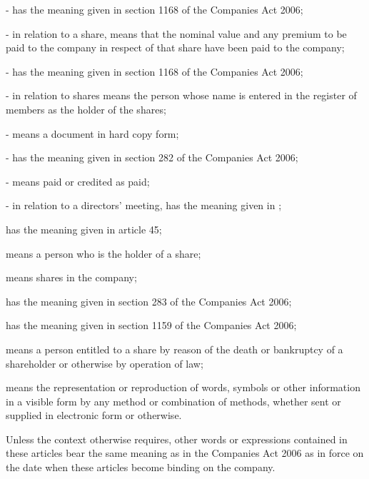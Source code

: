 \documentclass[letterpaper,10pt,openany,oneside,english]{sphinxmanual}
\begin{document}
 - has the meaning given in section 1168 of the Companies Act 2006;

 - in relation to a share, means that the nominal value and any premium to be paid to the company in respect of that share have been paid to the company;

 - has the meaning given in section 1168 of the Companies Act 2006;

 - in relation to shares means the person whose name is entered in the register of members as the holder of the shares;

 - means a document in hard copy form;

 - has the meaning given in section 282 of the Companies Act 2006;

 - means paid or credited as paid;

 - in relation to a directors’ meeting, has the meaning given in {\hyperref[\detokenize{directors:article-10}]{}};

 has the meaning given in article 45;

 means a person who is the holder of a share;

 means shares in the company;

 has the meaning given in section 283 of the Companies Act 2006;

 has the meaning given in section 1159 of the Companies Act 2006;

 means a person entitled to a share by reason of the death or bankruptcy of a shareholder or otherwise by operation of law;

 means the representation or reproduction of words, symbols or other information in a visible form by any method or combination of methods, whether sent or supplied in electronic form or otherwise.

Unless the context otherwise requires, other words or expressions contained in these articles bear the same meaning as in the Companies Act 2006 as in force on the date when these articles become binding on the company.
\end{document}
